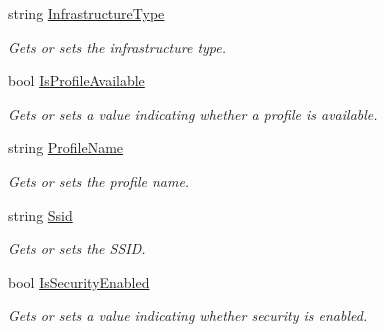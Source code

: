 \begin{DoxyCompactItemize}
string \hyperlink{class_microsoft_1_1_tools_1_1_windows_device_portal_1_1_device_portal_1_1_wifi_network_info_a1c032250248ebc50bdc67ad35d202f41}{Infrastructure\+Type}
\begin{DoxyCompactList}\small\item\em Gets or sets the infrastructure type. \end{DoxyCompactList}\item 
bool \hyperlink{class_microsoft_1_1_tools_1_1_windows_device_portal_1_1_device_portal_1_1_wifi_network_info_a661ca5ebe5b4416e9903a16e16ac8f45}{Is\+Profile\+Available}
\begin{DoxyCompactList}\small\item\em Gets or sets a value indicating whether a profile is available. \end{DoxyCompactList}\item 
string \hyperlink{class_microsoft_1_1_tools_1_1_windows_device_portal_1_1_device_portal_1_1_wifi_network_info_a2d03ab7703edb3bb82e09ed11529d103}{Profile\+Name}
\begin{DoxyCompactList}\small\item\em Gets or sets the profile name. \end{DoxyCompactList}\item 
string \hyperlink{class_microsoft_1_1_tools_1_1_windows_device_portal_1_1_device_portal_1_1_wifi_network_info_a75d602d08251f72a1508659a3ae8d611}{Ssid}
\begin{DoxyCompactList}\small\item\em Gets or sets the S\+S\+ID. \end{DoxyCompactList}\item 
bool \hyperlink{class_microsoft_1_1_tools_1_1_windows_device_portal_1_1_device_portal_1_1_wifi_network_info_a2ad36adfb4a09ca6e79a14f46e5c415a}{Is\+Security\+Enabled}
\begin{DoxyCompactList}\small\item\em Gets or sets a value indicating whether security is enabled. \end{DoxyCompactList}\item 

\end{DoxyCompactItemize}
